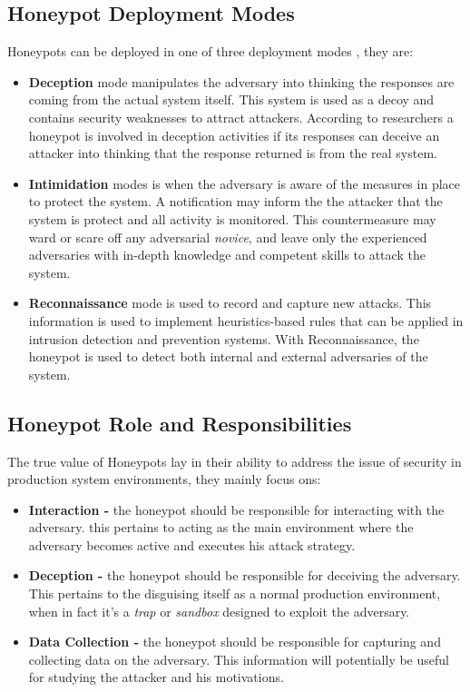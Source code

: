 \documentclass[grad,lot,lof,11pt,oneside,onehalfspace]{RUthesis}
\begin{document}
\subsection{Honeypot Deployment Modes}
Honeypots can be deployed in one of three deployment modes \cite{campbell_survey_2015}, they are:
\begin{itemize}
	\item \textbf{Deception} mode manipulates the adversary into thinking the responses are coming from the actual system itself. This system is used as a decoy and contains security weaknesses to attract attackers. According to researchers a honeypot is involved in deception activities if its responses can deceive an attacker into thinking that the response returned is from the real system. 
	\item \textbf{Intimidation} modes is when the adversary is aware of the measures in place to protect the system. A notification may inform the the attacker that the system is protect and all activity is monitored. This countermeasure may ward or scare off any adversarial \textit{novice}, and leave only the experienced adversaries with in-depth knowledge and competent skills to attack the system. 
	\item \textbf{Reconnaissance} mode is used to record and capture new attacks. This information is used to implement heuristics-based rules that can be applied in intrusion detection and prevention systems. With Reconnaissance,  the honeypot is used to detect both internal and external adversaries of the system. 
\end{itemize}
\subsection{Honeypot Role and Responsibilities}
The true value of Honeypots lay in their ability to address the issue of security in production system environments, they mainly focus ons:
\begin{itemize}
	\item \textbf{Interaction -}
	the honeypot should be responsible for interacting with the adversary. this pertains to acting as the main environment where the adversary becomes active and executes his attack strategy. 
	\item \textbf{Deception -}
	the honeypot should be responsible for deceiving the adversary. This pertains to the disguising itself as a normal production environment, when in fact it's a \textit{trap} or \textit{sandbox} designed to exploit the adversary. 
	\item \textbf{Data Collection -}
	the honeypot should be responsible for capturing and collecting data on the adversary. This information will potentially be useful for studying the attacker and his motivations. 
\end{itemize}
\end{document}

